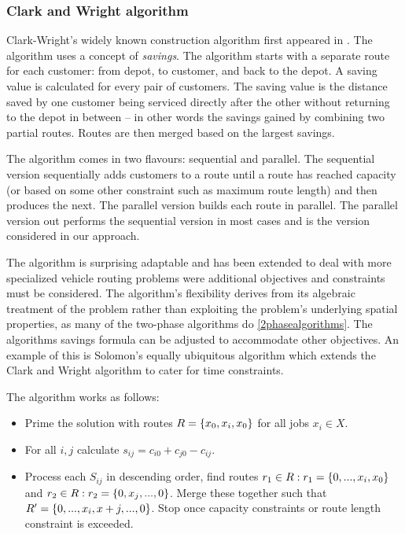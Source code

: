 \subsubsection{Clark and Wright algorithm}

Clark-Wright's widely known construction algorithm first appeared in \cite{clark:1964}. The algorithm uses a concept of \emph{savings}. The algorithm starts with a separate route for each customer: from depot, to customer, and back to the depot. A saving value is calculated for every pair of customers. The saving value is the distance saved by one customer being serviced directly after the other without returning to the depot in between -- in other words the savings gained by combining two partial routes. Routes are then merged based on the largest savings.

The algorithm comes in two flavours: sequential and parallel. The sequential version sequentially adds customers to a route until a route has reached capacity (or based on some other constraint such as maximum route length) and then produces the next. The parallel version builds each route in parallel. The parallel version out performs the sequential version in most cases\cite{Laporte:1999} and is the version considered in our approach.

The algorithm is surprising adaptable and has been extended to deal with more specialized vehicle routing problems were additional objectives and constraints must be considered. The algorithm's flexibility derives from its algebraic treatment of the problem rather than exploiting the problem's underlying spatial properties, as many of the two-phase algorithms do \ref{2phasealgorithms}. The algorithms savings formula can be adjusted to accommodate other objectives. An example of this is Solomon's equally ubiquitous algorithm \cite{Solomon:1987} which extends the Clark and Wright algorithm to cater for time constraints. 

The algorithm works as follows:

\begin{itemize}
	\item Prime the solution with routes $R = \{x_0, x_i, x_0\}$ for all jobs $x_i \in X$.
	\item For all $i,j$ calculate $s_{ij} = c_{i0} + c_{j0} - c_{ij}$.
	\item Process each $S_{ij}$ in descending order, find routes $r_1 \in R : r_1 = \{0,...,x_i,x_0\}$ and $r_2 \in R: r_2 = \{0,x_j,...,0\}$. Merge these together such that $R' = \{0,...,x_i, x+j,...,0\}$. Stop once capacity constraints or route length constraint is exceeded.
\end{itemize}


